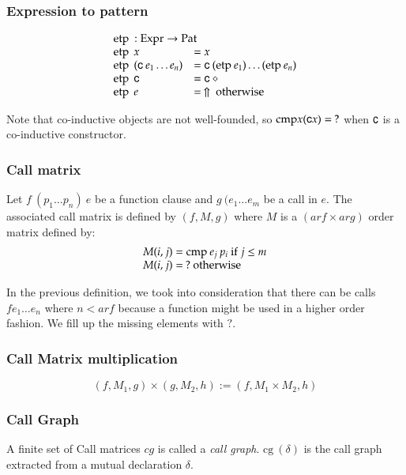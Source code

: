 \subsubsection{Expression to pattern}
\[
\begin{array}[t]{ll}
\multicolumn{2}{l}{\etp : \Expr \ra \Pat}\\ 
\etp \: x & = x \\
\etp \: (\cc \: e_1 \ldots e_n ) & = \cc \: (\etp e_1) \ldots (\etp e_n) \\
\etp \: \cc & = \cc \: \diamond \\
\etp \: e & = \stuck \mbox{ otherwise}
\end{array}
\]

Note that co-inductive objects are not well-founded, so  $\mathrm{cmp} x (\mathsf{c} x) = \: ? $ when $\mathsf{c}$ is a co-inductive constructor.

\subsubsection{Call matrix}
Let $f \: (p_1 \ldots p_n) \: e$ be a function clause and $g \: (e_1 \ldots e_m$ be a call in $e$.
The associated call matrix is defined by $(f,M,g)$ where $M$ is a $(ar f \times ar g)$ order matrix defined by:
\[ 
\begin{array}[t]{l}
M(i,j) = \mathrm{cmp} \: e_j \: p_i \mbox{ if } j \leq m \\
M(i,j) = \: ? \mbox{ otherwise} 
\end{array}
\]

In the previous definition, we took into consideration that there can be calls $f e_1 \ldots e_n$ where $n < ar f$ because a function might be used in a higher order fashion. We fill up the missing elements with $?$. 

\subsubsection{Call Matrix multiplication}
\[(f,M_1,g) \times (g,M_2,h) := (f,M_1 \times M_2,h)\]

\newcommand{\cg}{\mathrm{cg}\:}
\newcommand{\complete}{\mathrm{complete}\:}

\subsubsection{Call Graph}
A finite set of Call matrices $cg$ is called a \emph{call graph}.
$\cg(\delta)$ is the call graph extracted from a mutual declaration $\delta$.

